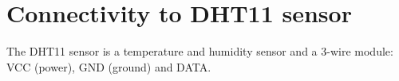 \section{Connectivity to DHT11 sensor}
The DHT11 sensor is a temperature and humidity sensor and a 3-wire module: VCC (power), GND (ground) and DATA.\\
\begin{figure}[!ht]%
    \centering
    \qquad

\end{figure}
